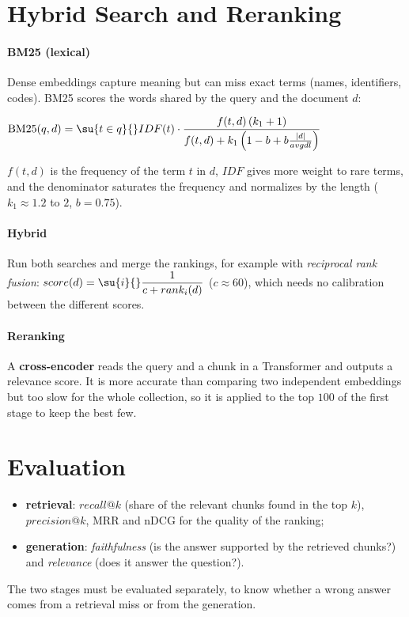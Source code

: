 \section{Hybrid Search and Reranking}
\paragraph{BM25 (lexical)} Dense embeddings capture meaning but can miss exact terms (names,
identifiers, codes). BM25 scores the words shared by the query and the document $d$:
\begin{center}
    $\mathrm{BM25}(q,d)=\su{t\in q}{}IDF(t)\cdot\dfrac{f(t,d)\,(k_{1}+1)}{f(t,d)+k_{1}
    \left(1-b+b\frac{|d|}{avgdl}\right)}$
\end{center}
$f(t,d)$ is the frequency of the term $t$ in $d$, $IDF$ gives more weight to rare terms,
and the denominator saturates the frequency and normalizes by the length ($k_{1}\approx1.2$ to
$2$, $b=0.75$).

\paragraph{Hybrid} Run both searches and merge the rankings, for example with
\emph{reciprocal rank fusion}: $score(d)=\su{i}{}\dfrac{1}{c+rank_{i}(d)}$ ($c\approx60$),
which needs no calibration between the different scores.

\paragraph{Reranking} A \textbf{cross-encoder} reads the query and a chunk  in
a Transformer and outputs a relevance score. It is more accurate than comparing two
independent embeddings but too slow for the whole collection, so it is applied to the top
$100$ of the first stage to keep the best few.

\section{Evaluation}
\begin{itemize}
    \item \textbf{retrieval}: $recall@k$ (share of the relevant chunks found in the top $k$),
        $precision@k$, MRR and nDCG for the quality of the ranking;
    \item \textbf{generation}: \emph{faithfulness} (is the answer supported by the retrieved
        chunks?) and \emph{relevance} (does it answer the question?).
\end{itemize}
The two stages must be evaluated separately, to know whether a wrong answer comes from a
retrieval miss or from the generation.

